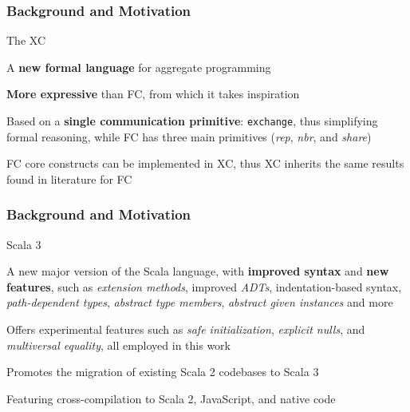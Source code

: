 \begin{frame}
    \frametitle{Background and Motivation}
    \begin{blockitems}{The \ac{XC}}
        \item A \textbf{new formal language} for aggregate programming~\cite{xc}
        \item \textbf{More expressive} than \ac{FC}, from which it takes inspiration
        \item Based on a \textbf{single communication primitive}: \texttt{exchange}, thus simplifying formal reasoning, while \ac{FC} has three main primitives (\textit{rep}, \textit{nbr}, and \textit{share})
        \item \ac{FC} core constructs can be implemented in \ac{XC}, thus \ac{XC} inherits the same results found in literature for \ac{FC}
    \end{blockitems}
\end{frame}

\begin{frame}
    \frametitle{Background and Motivation}
    \begin{blockitems}{Scala 3}
        \item A new major version of the Scala language, with \textbf{improved syntax} and \textbf{new features}, such as \textit{extension methods}, improved \textit{\acp{ADT}}, indentation-based syntax, \textit{path-dependent types}, \textit{abstract type members}, \textit{abstract given instances} and more
        \item Offers experimental features such as \textit{safe initialization}, \textit{explicit nulls}, and \textit{multiversal equality}, all employed in this work
        \item Promotes the migration of existing Scala 2 codebases to Scala 3
        \item Featuring cross-compilation to Scala 2, JavaScript, and native code
    \end{blockitems}
\end{frame}

